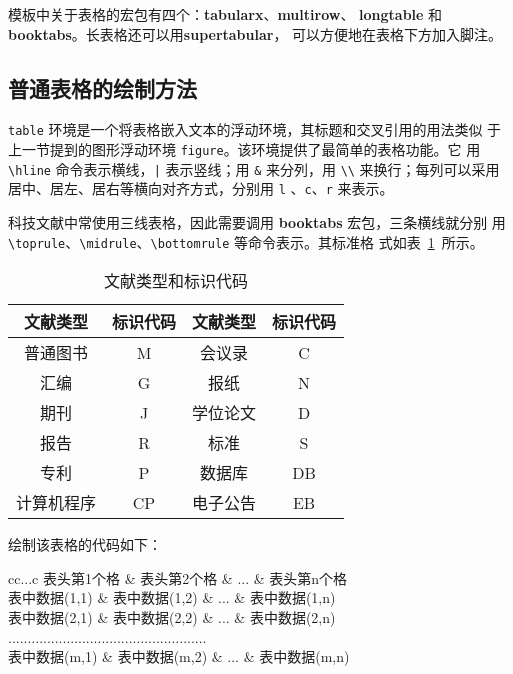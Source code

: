 模板中关于表格的宏包有四个：\textbf{tabularx}、\textbf{multirow}、
\textbf{longtable} 和\textbf{booktabs}。长表格还可以用\textbf{supertabular}，
可以方便地在表格下方加入脚注。

\subsection{普通表格的绘制方法}

\texttt{table} 环境是一个将表格嵌入文本的浮动环境，其标题和交叉引用的用法类似
于上一节提到的图形浮动环境 \texttt{figure}。该环境提供了最简单的表格功能。它
用 \verb|\hline| 命令表示横线，\verb&|& 表示竖线；用 \verb|&| 来分列，用
\verb|\\| 来换行；每列可以采用居中、居左、居右等横向对齐方式，分别用 \verb|l|
、\verb|c|、\verb|r| 来表示。

科技文献中常使用三线表格，因此需要调用 \textbf{booktabs} 宏包，三条横线就分别
用 \verb|\toprule|、\verb|\midrule|、\verb|\bottomrule| 等命令表示。其标准格
式如表~\ref{table1}~所示。

\begin{table}[htbp]
\caption{文献类型和标识代码}
\label{table1}
\centering
\begin{tabular}{cccc}
\toprule
文献类型 & 标识代码 & 文献类型 & 标识代码\\
\midrule
普通图书 & M &  会议录 & C\\
汇编 & G & 报纸 & N\\
期刊 & J & 学位论文 & D\\
报告 & R & 标准 & S\\
专利 & P & 数据库 & DB\\
计算机程序 & CP & 电子公告 & EB\\
\bottomrule
\end{tabular}
\end{table}

绘制该表格的代码如下：
\begin{code}
\begin{table}[htbp]
\caption{表格标题}
\label{标签名}
\centering
\begin{tabular}{cc...c}
\toprule
表头第1个格   & 表头第2个格   & ... & 表头第n个格  \\
\midrule
表中数据(1,1) & 表中数据(1,2) & ... & 表中数据(1,n)\\
表中数据(2,1) & 表中数据(2,2) & ... & 表中数据(2,n)\\
...................................................\\
表中数据(m,1) & 表中数据(m,2) & ... & 表中数据(m,n)\\
\bottomrule
\end{tabular}
\end{table}
\end{code}

